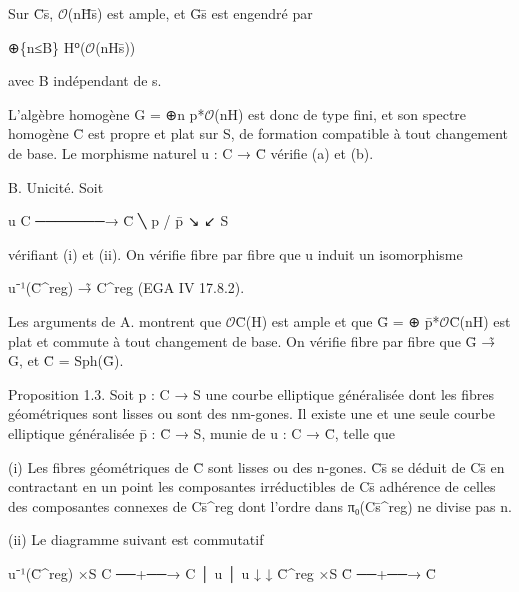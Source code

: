 \documentclass[11pt,a4paper]{article}
\begin{document}
Sur C̄\textunderscore{}s̄, \ensuremath{\mathcal{O}}(nH̄\textunderscore{}s̄) est ample, et Ḡ\textunderscore{}s̄ est engendré par

⊕\textunderscore{}\{n≤B\} H⁰(\ensuremath{\mathcal{O}}(nH\textunderscore{}s̄))

avec B indépendant de s.

L'algèbre homogène G = ⊕\textunderscore{}n p\textunderscore{}*\ensuremath{\mathcal{O}}(nH) est donc de type fini, et son spectre homogène C̄ est propre et plat sur S, de formation compatible à tout changement de base. Le morphisme naturel u : C → C̄ vérifie (a) et (b).

B. Unicité. Soit

u C ───────→ C̄ ╲ p      / p̄ ↘      ↙ S

vérifiant (i) et (ii). On vérifie fibre par fibre que u induit un isomorphisme

u⁻¹(C̄\textasciicircum{}reg) →̃ C\textasciicircum{}reg       (EGA IV 17.8.2).

Les arguments de A. montrent que \ensuremath{\mathcal{O}}\textunderscore{}C̄(H) est ample et que Ḡ = ⊕ p̄\textunderscore{}*\ensuremath{\mathcal{O}}\textunderscore{}C̄(nH) est plat et commute à tout changement de base. On vérifie fibre par fibre que Ḡ →̃ G, et C̄ = Sph(Ḡ).

Proposition 1.3. Soit p : C → S une courbe elliptique généralisée dont les fibres géométriques sont lisses ou sont des nm-gones. Il existe une et une seule courbe elliptique généralisée p̄ : C̄ → S, munie de u : C → C̄, telle que

(i) Les fibres géométriques de C̄ sont lisses ou des n-gones. C̄\textunderscore{}s̄ se déduit de C\textunderscore{}s̄ en contractant en un point les composantes irréductibles de C\textunderscore{}s̄ adhérence de celles des composantes connexes de C\textunderscore{}s̄\textasciicircum{}reg dont l'ordre dans π₀(C\textunderscore{}s̄\textasciicircum{}reg) ne divise pas n.

(ii) Le diagramme suivant est commutatif

u⁻¹(C̄\textasciicircum{}reg) ×\textunderscore{}S C  ──+──→  C │ u                    │ u ↓                      ↓ C̄\textasciicircum{}reg ×\textunderscore{}S C̄   ──+──→  C̄
\end{document}
